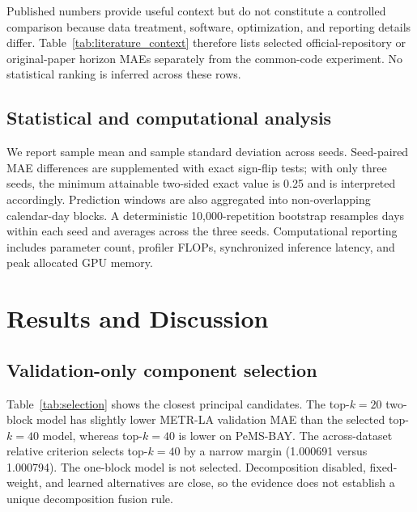 \documentclass[fleqn,10pt]{wlscirep}
\begin{document}
Published numbers provide useful context but do not constitute a controlled
comparison because data treatment, software, optimization, and reporting
details differ. Table~\ref{tab:literature_context} therefore lists selected
official-repository or original-paper horizon MAEs separately from the
common-code experiment. No statistical ranking is inferred across these rows.
\begin{table}[t]
\centering
\caption{Non-harmonized literature context: horizon-wise MAE reported by the
DCRNN official repository and the original Graph WaveNet and AGCRN papers
\cite{li2018dcrnn,wu2019graphwavenet,bai2020agcrn}, alongside ASTAF-R under
the present protocol. These values are not treated as a head-to-head
experiment.}
\label{tab:literature_context}
\small
\resizebox{\textwidth}{!}{}
\end{table}

\subsection{Statistical and computational analysis}
We report sample mean and sample standard deviation across seeds. Seed-paired
MAE differences are supplemented with exact sign-flip tests; with only three
seeds, the minimum attainable two-sided exact value is 0.25 and is interpreted
accordingly. Prediction windows are also aggregated into non-overlapping
calendar-day blocks. A deterministic 10,000-repetition bootstrap resamples days
within each seed and averages across the three seeds. Computational reporting
includes parameter count, profiler FLOPs, synchronized inference latency, and
peak allocated GPU memory.

\section{Results and Discussion}
\label{sec:results}
\subsection{Validation-only component selection}
Table~\ref{tab:selection} shows the closest principal candidates. The
top-$k=20$ two-block model has slightly lower METR-LA validation MAE than the
selected top-$k=40$ model, whereas top-$k=40$ is lower on PeMS-BAY. The
across-dataset relative criterion selects top-$k=40$ by a narrow margin
(1.000691 versus 1.000794). The one-block model is not selected. Decomposition
disabled, fixed-weight, and learned alternatives are close, so the evidence
does not establish a unique decomposition fusion rule.
\end{document}
